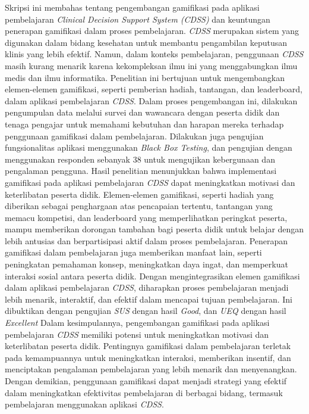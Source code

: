 Skripsi ini membahas tentang pengembangan gamifikasi pada aplikasi pembelajaran \textit{Clinical Decision Support System (\textit{CDSS})} dan keuntungan penerapan gamifikasi dalam proses pembelajaran. 
\textit{CDSS} merupakan sistem yang digunakan dalam bidang kesehatan untuk membantu pengambilan keputusan klinis yang lebih efektif. 
Namun, dalam konteks pembelajaran, penggunaan \textit{CDSS} masih kurang menarik karena kekompleksan ilmu ini yang menggabungkan ilmu medis dan ilmu informatika.
Penelitian ini bertujuan untuk mengembangkan elemen-elemen gamifikasi, seperti pemberian hadiah, tantangan, dan leaderboard, dalam aplikasi pembelajaran \textit{CDSS}. 
Dalam proses pengembangan ini, dilakukan pengumpulan data melalui survei dan wawancara dengan peserta didik dan tenaga pengajar untuk memahami kebutuhan dan harapan mereka terhadap penggunaan gamifikasi dalam pembelajaran.
Dilakukan juga pengujian fungsionalitas aplikasi menggunakan \textit{Black Box Testing}, dan pengujian dengan menggunakan responden sebanyak 38 untuk mengujikan kebergunaan dan pengalaman pengguna.
Hasil penelitian menunjukkan bahwa implementasi gamifikasi pada aplikasi pembelajaran \textit{CDSS} dapat meningkatkan motivasi dan keterlibatan peserta didik. Elemen-elemen gamifikasi, seperti hadiah yang diberikan sebagai penghargaan atas pencapaian tertentu, tantangan yang memacu kompetisi, dan leaderboard yang memperlihatkan peringkat peserta, mampu memberikan dorongan tambahan bagi peserta didik untuk belajar dengan lebih antusias dan berpartisipasi aktif dalam proses pembelajaran.
Penerapan gamifikasi dalam pembelajaran juga memberikan manfaat lain, seperti peningkatan pemahaman konsep, meningkatkan daya ingat, dan memperkuat interaksi sosial antara peserta didik. Dengan mengintegrasikan elemen gamifikasi dalam aplikasi pembelajaran \textit{CDSS}, diharapkan proses pembelajaran menjadi lebih menarik, interaktif, dan efektif dalam mencapai tujuan pembelajaran. Ini dibuktikan dengan pengujian \textit{SUS} dengan hasil \textit{Good}, dan \textit{UEQ} dengan hasil \textit{Excellent}
Dalam kesimpulannya, pengembangan gamifikasi pada aplikasi pembelajaran \textit{CDSS} memiliki potensi untuk meningkatkan motivasi dan keterlibatan peserta didik. Pentingnya gamifikasi dalam pembelajaran terletak pada kemampuannya untuk meningkatkan interaksi, memberikan insentif, dan menciptakan pengalaman pembelajaran yang lebih menarik dan menyenangkan. Dengan demikian, penggunaan gamifikasi dapat menjadi strategi yang efektif dalam meningkatkan efektivitas pembelajaran di berbagai bidang, termasuk pembelajaran menggunakan aplikasi \textit{CDSS}.


